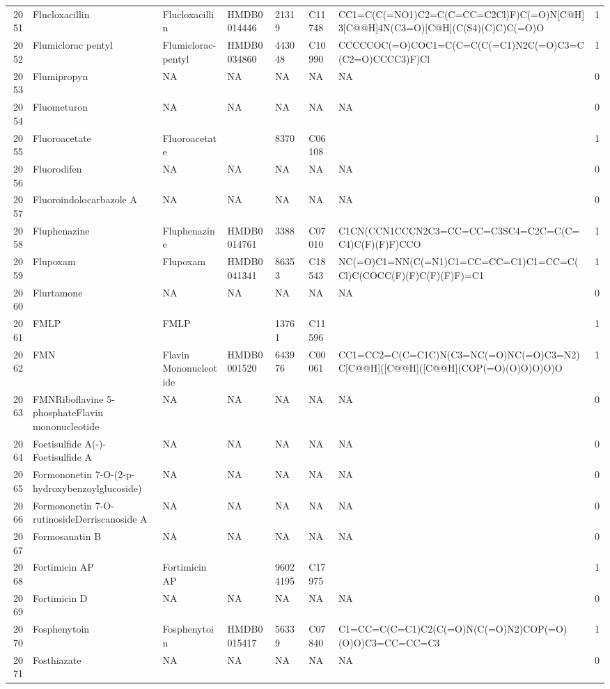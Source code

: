 \documentclass[a4paper]{article}
\begin{document}
\begin{longtable}{rlllllll}
  2051 & Flucloxacillin & Flucloxacillin & HMDB0014446 & 21319 & C11748 & CC1=C(C(=NO1)C2=C(C=CC=C2Cl)F)C(=O)N[C@H]3[C@@H]4N(C3=O)[C@H](C(S4)(C)C)C(=O)O & 1 \\ 
  2052 & Flumiclorac pentyl & Flumiclorac-pentyl & HMDB0034860 & 443048 & C10990 & CCCCCOC(=O)COC1=C(C=C(C(=C1)N2C(=O)C3=C(C2=O)CCCC3)F)Cl & 1 \\ 
  2053 & Flumipropyn & NA & NA & NA & NA & NA & 0 \\ 
  2054 & Fluometuron & NA & NA & NA & NA & NA & 0 \\ 
  2055 & Fluoroacetate & Fluoroacetate &  & 8370 & C06108 &  & 1 \\ 
  2056 & Fluorodifen & NA & NA & NA & NA & NA & 0 \\ 
  2057 & Fluoroindolocarbazole A & NA & NA & NA & NA & NA & 0 \\ 
  2058 & Fluphenazine & Fluphenazine & HMDB0014761 & 3388 & C07010 & C1CN(CCN1CCCN2C3=CC=CC=C3SC4=C2C=C(C=C4)C(F)(F)F)CCO & 1 \\ 
  2059 & Flupoxam & Flupoxam & HMDB0041341 & 86353 & C18543 & NC(=O)C1=NN(C(=N1)C1=CC=CC=C1)C1=CC=C(Cl)C(COCC(F)(F)C(F)(F)F)=C1 & 1 \\ 
  2060 & Flurtamone & NA & NA & NA & NA & NA & 0 \\ 
  2061 & FMLP & FMLP &  & 13761 & C11596 &  & 1 \\ 
  2062 & FMN & Flavin Mononucleotide & HMDB0001520 & 643976 & C00061 & CC1=CC2=C(C=C1C)N(C3=NC(=O)NC(=O)C3=N2)C[C@@H]([C@@H]([C@@H](COP(=O)(O)O)O)O)O & 1 \\ 
  2063 & FMNRiboflavine 5-phosphateFlavin mononucleotide & NA & NA & NA & NA & NA & 0 \\ 
  2064 & Foetisulfide A(-)-Foetisulfide A & NA & NA & NA & NA & NA & 0 \\ 
  2065 & Formononetin 7-O-(2-p-hydroxybenzoylglucoside) & NA & NA & NA & NA & NA & 0 \\ 
  2066 & Formononetin 7-O-rutinosideDerriscanoside A & NA & NA & NA & NA & NA & 0 \\ 
  2067 & Formosanatin B & NA & NA & NA & NA & NA & 0 \\ 
  2068 & Fortimicin AP & Fortimicin AP &  & 96024195 & C17975 &  & 1 \\ 
  2069 & Fortimicin D & NA & NA & NA & NA & NA & 0 \\ 
  2070 & Fosphenytoin & Fosphenytoin & HMDB0015417 & 56339 & C07840 & C1=CC=C(C=C1)C2(C(=O)N(C(=O)N2)COP(=O)(O)O)C3=CC=CC=C3 & 1 \\ 
  2071 & Fosthiazate & NA & NA & NA & NA & NA & 0 \\ 

\end{longtable}
\end{document}
